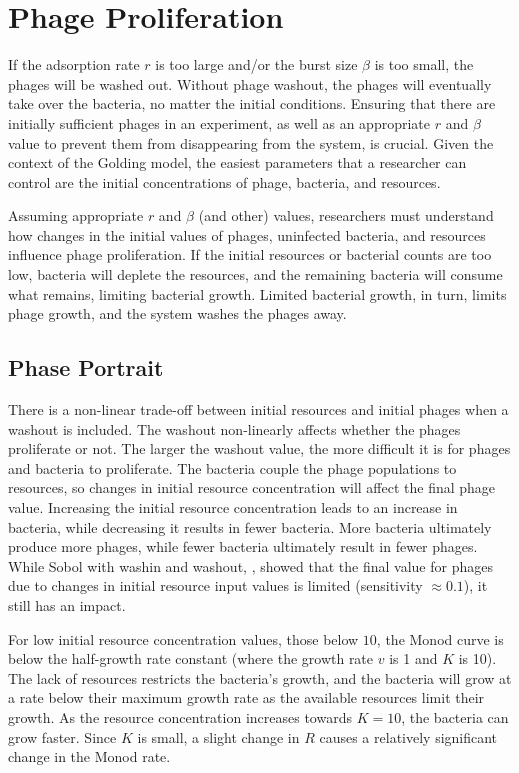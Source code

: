 \section{Phage Proliferation}
If the adsorption rate $r$ is too large and/or the burst size $\beta$ is too small, the phages will be washed out.  
Without phage washout, the phages will eventually take over the bacteria, no matter the initial conditions. 
Ensuring that there are initially sufficient phages in an experiment, as well as an appropriate $r$ and $\beta$ value to prevent them from disappearing from the system, is crucial. 
Given the context of the Golding model, the easiest parameters that a researcher can control are the initial concentrations of phage, bacteria, and resources. 

Assuming appropriate $r$ and $\beta$ (and other) values, researchers must understand how changes in the initial values of phages, uninfected bacteria, and resources influence phage proliferation.
If the initial resources or bacterial counts are too low, bacteria will deplete the resources, and the remaining bacteria will consume what remains, limiting bacterial growth.
Limited bacterial growth, in turn, limits phage growth, and the system washes the phages away.

\subsection{Phase Portrait}
There is a non-linear trade-off between initial resources and initial phages when a washout is included. 
The washout non-linearly affects whether the phages proliferate or not. 
The larger the washout value, the more difficult it is for phages and bacteria to proliferate. 
The bacteria couple the phage populations to resources, so changes in initial resource concentration will affect the final phage value. 
Increasing the initial resource concentration leads to an increase in bacteria, while decreasing it results in fewer bacteria.
More bacteria ultimately produce more phages, while fewer bacteria ultimately result in fewer phages.
While Sobol with washin and washout, , showed that the final value for phages due to changes in initial resource input values is limited (sensitivity $\approx 0.1$), it still has an impact. 

For low initial resource concentration values, those below $10$, the Monod curve is below the half-growth rate constant (where the growth rate $v$ is 1 and $K$ is 10). 
The lack of resources restricts the bacteria’s growth, and the bacteria will grow at a rate below their maximum growth rate as the available resources limit their growth. 
As the resource concentration increases towards $K=10$, the bacteria can grow faster. 
Since $K$ is small, a slight change in $R$ causes a relatively significant change in the Monod rate. 

